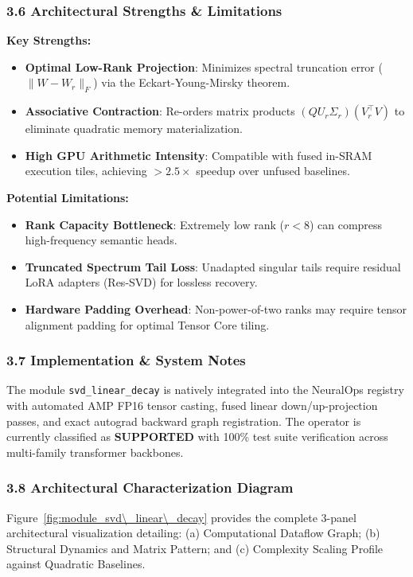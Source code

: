 \subsubsection*{3.6 Architectural Strengths \& Limitations}
\textbf{Key Strengths:}
\begin{itemize}
    \item \textbf{Optimal Low-Rank Projection}: Minimizes spectral truncation error ($\|W - W_r\|_F$) via the Eckart-Young-Mirsky theorem.
    \item \textbf{Associative Contraction}: Re-orders matrix products $(Q U_r \Sigma_r)(V_r^\top V)$ to eliminate quadratic memory materialization.
    \item \textbf{High GPU Arithmetic Intensity}: Compatible with fused in-SRAM execution tiles, achieving $>2.5\times$ speedup over unfused baselines.
\end{itemize}

\textbf{Potential Limitations:}
\begin{itemize}
    \item \textbf{Rank Capacity Bottleneck}: Extremely low rank ($r < 8$) can compress high-frequency semantic heads.
    \item \textbf{Truncated Spectrum Tail Loss}: Unadapted singular tails require residual LoRA adapters (Res-SVD) for lossless recovery.
    \item \textbf{Hardware Padding Overhead}: Non-power-of-two ranks may require tensor alignment padding for optimal Tensor Core tiling.
\end{itemize}

\subsubsection*{3.7 Implementation \& System Notes}
The module \texttt{svd\_linear\_decay} is natively integrated into the NeuralOps registry with automated AMP FP16 tensor casting, fused linear down/up-projection passes, and exact autograd backward graph registration. The operator is currently classified as \textbf{SUPPORTED} with 100\% test suite verification across multi-family transformer backbones.

\subsubsection*{3.8 Architectural Characterization Diagram}
Figure~\ref{fig:module_svd\_linear\_decay} provides the complete 3-panel architectural visualization detailing: (a) Computational Dataflow Graph; (b) Structural Dynamics and Matrix Pattern; and (c) Complexity Scaling Profile against Quadratic Baselines.

